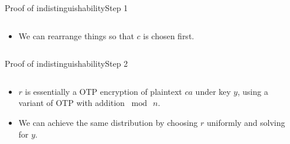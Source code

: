 \documentclass[aspectratio=169, lualatex, handout]{beamer}
\begin{document}
\begin{frame}{Proof of indistinguishability}{Step 1}
	\begin{columns}[c]
		\begin{column}{0.5\textwidth}
			\begin{itemize}[<+->]
				\item We can rearrange things so that $c$ is chosen first.
			\end{itemize}
		\end{column}
		\begin{column}{0.5\textwidth}
			\begin{center}
			\end{center}
		\end{column}
	\end{columns}
\end{frame}

\begin{frame}{Proof of indistinguishability}{Step 2}
	\begin{columns}[c]
		\begin{column}{0.5\textwidth}
			\begin{itemize}[<+->]
				\item $r$ is essentially a OTP encryption of plaintext $ca$ under key $y$, using a variant of OTP with addition $\bmod\ n$.
				\item We can achieve the same distribution by choosing $r$ uniformly and solving for $y$.
			\end{itemize}
		\end{column}
		\begin{column}{0.5\textwidth}
			\begin{center}
			\end{center}
		\end{column}
	\end{columns}
\end{frame}
\end{document}
